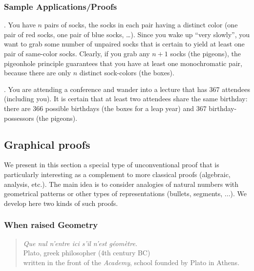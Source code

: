 \subsubsection{Sample Applications/Proofs}
\label{sec:pigeon-apps}

.
You have $n$ pairs of socks, the socks in each pair having a distinct
color (one pair of red socks, one pair of blue socks, \ldots).  Since
you wake up ``very slowly'', you want to grab some number of unpaired
socks that is certain to yield at least one pair of same-color socks.
Clearly, if you grab any $n+1$ socks (the pigeons), the pigeonhole
principle guarantees that you have at least one monochromatic pair,
because there are only $n$ distinct sock-colors (the boxes).

\medskip

.
You are attending a conference and wander into a lecture that has 367
attendees (including you).  It is certain that at least two attendees
share the same birthday: there are 366 possible birthdays (the boxes
for a leap year) and 367 birthday-possessors (the pigeons).




\subsection{Graphical proofs}
\label{sec:unconventionalproofs}


We present in this section a special type of unconventional proof
that is particularly interesting as a complement to more classical proofs (algebraic, analysis, etc.). 
The main idea is to consider analogies of natural numbers with geometrical patterns or other types of 
representations (bullets, segments, ...).
We develop here two kinds of such proofs. 

\subsubsection{When raised Geometry}

\begin{quote}
{\it Que nul n'entre ici s'il n'est g\'eom\`etre.} \\
\hspace*{2in} Plato, greek philosopher (4th century BC)\\
written in the front of the \textit{Academy}, school founded by Plato in Athens. 
\end{quote}
\medskip


